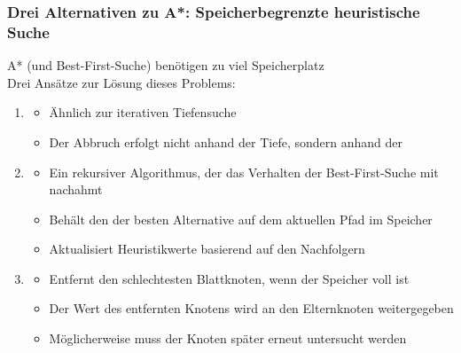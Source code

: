 \subsubsection*{Drei Alternativen zu A*: Speicherbegrenzte heuristische Suche}
 A* (und Best-First-Suche) benötigen zu viel Speicherplatz\\
Drei Ansätze zur Lösung dieses Problems:
\begin{enumerate}
    \item {}
    \begin{itemize}
        \item Ähnlich zur iterativen Tiefensuche
        \item Der Abbruch erfolgt nicht anhand der Tiefe, sondern anhand der 
    \end{itemize}
    \item {}
    \begin{itemize}
        \item Ein rekursiver Algorithmus, der das Verhalten der Best-First-Suche mit  nachahmt
        \item Behält den  der besten Alternative auf dem aktuellen Pfad im Speicher
        \item Aktualisiert Heuristikwerte basierend auf den Nachfolgern
    \end{itemize}
    \item {}
    \begin{itemize}
        \item Entfernt den schlechtesten Blattknoten, wenn der Speicher voll ist
        \item Der Wert des entfernten Knotens wird an den Elternknoten weitergegeben
        \item Möglicherweise muss der Knoten später erneut untersucht werden
    \end{itemize}
\end{enumerate}
